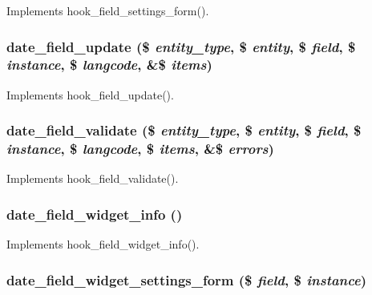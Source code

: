 \label{date_8field_8inc_a5f070593dfcf73a90c953b2402e0739b}
Implements hook\_\-field\_\-settings\_\-form(). \hypertarget{date_8field_8inc_a655f21522e69937fc4b8c8de19e395cf}{
\subsubsection[{date\_\-field\_\-update}]{\setlength{\rightskip}{0pt plus 5cm}date\_\-field\_\-update (\$ {\em entity\_\-type}, \/  \$ {\em entity}, \/  \$ {\em field}, \/  \$ {\em instance}, \/  \$ {\em langcode}, \/  \&\$ {\em items})}}
\label{date_8field_8inc_a655f21522e69937fc4b8c8de19e395cf}
Implements hook\_\-field\_\-update(). \hypertarget{date_8field_8inc_a0baf20c5214880496741eef3da69de79}{
\subsubsection[{date\_\-field\_\-validate}]{\setlength{\rightskip}{0pt plus 5cm}date\_\-field\_\-validate (\$ {\em entity\_\-type}, \/  \$ {\em entity}, \/  \$ {\em field}, \/  \$ {\em instance}, \/  \$ {\em langcode}, \/  \$ {\em items}, \/  \&\$ {\em errors})}}
\label{date_8field_8inc_a0baf20c5214880496741eef3da69de79}
Implements hook\_\-field\_\-validate(). \hypertarget{date_8field_8inc_a3985450d827612cb9e9c78297fa90cc7}{
\subsubsection[{date\_\-field\_\-widget\_\-info}]{\setlength{\rightskip}{0pt plus 5cm}date\_\-field\_\-widget\_\-info ()}}
\label{date_8field_8inc_a3985450d827612cb9e9c78297fa90cc7}
Implements hook\_\-field\_\-widget\_\-info(). \hypertarget{date_8field_8inc_aacfb6134f4d15984d676313004bc7939}{
\subsubsection[{date\_\-field\_\-widget\_\-settings\_\-form}]{\setlength{\rightskip}{0pt plus 5cm}date\_\-field\_\-widget\_\-settings\_\-form (\$ {\em field}, \/  \$ {\em instance})}}
